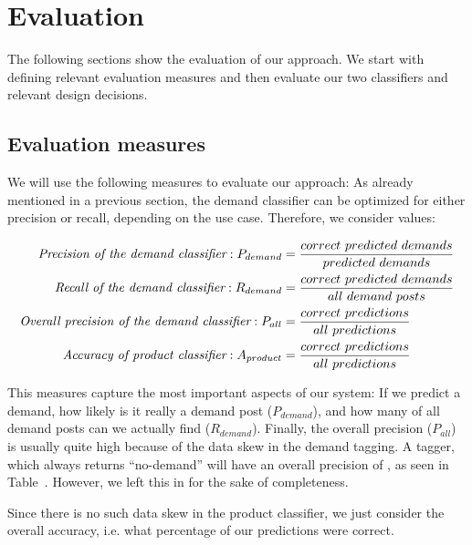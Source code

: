 
\section{Evaluation}
\label{sec:evaluation}

The following sections show the evaluation of our approach.
We start with defining relevant evaluation measures and then evaluate our two classifiers and relevant design decisions.

\subsection{Evaluation measures}
\label{sub:evaluation_measures}
We will use the following measures to evaluate our approach:
As already mentioned in a previous section, the demand classifier can be optimized for either precision or recall, depending on the use case.
Therefore, we consider  values:

\begin{align*}
 \emph{Precision of the demand classifier}: P_{demand} &= \frac{correct~predicted~demands}{predicted~demands} \\
 \emph{Recall of the demand classifier}: R_{demand} &= \frac{correct~predicted~demands}{all~demand~posts} \\
 \emph{Overall precision of the demand classifier}: P_{all} &= \frac{correct~predictions}{all~predictions} \\
 \emph{Accuracy of product classifier}: A_{product} &= \frac{correct~predictions}{all~predictions} \\
\end{align*}

This measures capture the most important aspects of our system: If we predict a demand, how likely is it really a demand post ($P_{demand}$), and how many of all demand posts can we actually find ($R_{demand}$).
Finally, the overall precision ($P_{all}$) is usually quite high because of the data skew in the demand tagging.
A tagger, which always returns ``no-demand'' will have an overall precision of , as seen in Table~.
However, we left this in for the sake of completeness.

Since there is no such data skew in the product classifier, we just consider the overall accuracy, i.e. what percentage of our predictions were correct.


